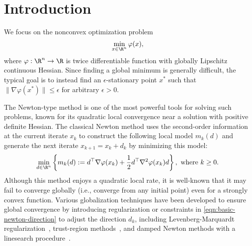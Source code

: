 
\section{Introduction} \label{sec:main/intro}
We focus on the nonconvex optimization problem
\begin{equation}
    \min_{x \in \R^n} \varphi(x),
\end{equation}
where $\varphi: \R^n \to \R$ is twice differentiable function with globally Lipschitz continuous Hessian.
Since finding a global minimum is generally difficult, 
 the typical goal is to instead find an $\epsilon$-stationary point $x^*$ such that $\| \nabla \varphi(x^*) \| \leq \epsilon$ for arbitrary $\epsilon>0$. 

The Newton-type method is one of the most powerful tools for solving such problems, 
known for 
its quadratic local convergence near a solution with positive definite Hessian. 
The classical Newton method uses the second-order information at the current iterate $x_k$ 
to construct the following local model $m_k(d)$ and generate the next iterate $x_{k+1} = x_k + d_k$ by minimizing this model:
\begin{equation}
   \min_{d \in \R^n} \left\{ 
        m_k(d) := 
        d^\top \nabla \varphi(x_k)
        + \frac{1}{2} d^\top \nabla^2\varphi(x_k) d
     \right\}, 
     \text{ where }
     k\ge0.
     \label{eqn:basic-newton-direction}
\end{equation}
Although this method enjoys a quadratic local rate,
it is well-known that it may fail to converge globally (i.e., converge from any initial point) even for a strongly convex function. %
Various globalization techniques have been developed to ensure global convergence by introducing regularization or constraints in \eqref{eqn:basic-newton-direction} to adjust the %
direction $d_k$,
including 
Levenberg-Marquardt regularization~\citep{levenberg1944method,marquardt1963algorithm}, trust-region methods~\citep{conn2000trust},
and damped Newton methods with a linesearch procedure~\citep{nocedal1999numerical}. 

